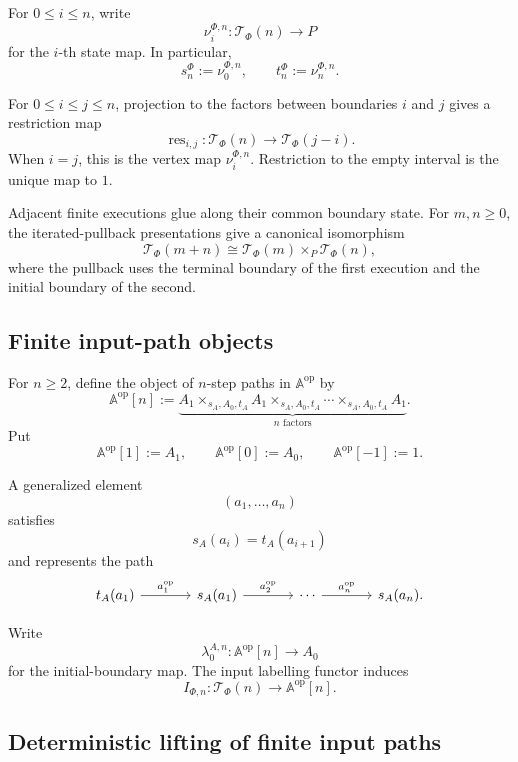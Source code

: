 For \(0\leq i\leq n\), write
\[
    \nu_i^{\Phi,n}:
    \mathscr T_\Phi(n)\to P
\]
for the \(i\)-th state map. In particular,
\[
    s_n^\Phi:=\nu_0^{\Phi,n},
    \qquad
    t_n^\Phi:=\nu_n^{\Phi,n}.
\]

For \(0\leq i\leq j\leq n\), projection to the factors between boundaries
\(i\) and \(j\) gives a restriction map
\[
    \operatorname{res}_{i,j}:
    \mathscr T_\Phi(n)
    \longrightarrow
    \mathscr T_\Phi(j-i).
\]
When \(i=j\), this is the vertex map
\(\nu_i^{\Phi,n}\). Restriction to the empty interval is the unique map to
\(1\).

Adjacent finite executions glue along their common boundary state. For
\(m,n\geq0\), the iterated-pullback presentations give a canonical
isomorphism
\[
    \mathscr T_\Phi(m+n)
    \cong
    \mathscr T_\Phi(m)
    \times_P
    \mathscr T_\Phi(n),
\]
where the pullback uses the terminal boundary of the first execution and the
initial boundary of the second.

\subsection{Finite input-path objects}
\label{subsec:finite-input-path-objects}

For \(n\geq2\), define the object of \(n\)-step paths in
\(\mathbb A^{\mathrm{op}}\) by
\[
    \mathbb A^{\mathrm{op}}[n]
    :=
    \underbrace{
    A_1
    \times_{s_A,A_0,t_A}
    A_1
    \times_{s_A,A_0,t_A}
    \cdots
    \times_{s_A,A_0,t_A}
    A_1
    }_{n\text{ factors}}.
\]
Put
\[
    \mathbb A^{\mathrm{op}}[1]:=A_1,
    \qquad
    \mathbb A^{\mathrm{op}}[0]:=A_0,
    \qquad
    \mathbb A^{\mathrm{op}}[-1]:=1.
\]

A generalized element
\[
    (a_1,\ldots,a_n)
\]
satisfies
\[
    s_A(a_i)=t_A(a_{i+1})
\]
and represents the path
\[
\begin{tikzcd}[column sep=large]
    t_A(a_1)
        \arrow[r, "a_1^{\mathrm{op}}"]
    &
    s_A(a_1)
        \arrow[r, "a_2^{\mathrm{op}}"]
    &
    \cdots
        \arrow[r, "a_n^{\mathrm{op}}"]
    &
    s_A(a_n).
\end{tikzcd}
\]

Write
\[
    \lambda_0^{A,n}:
    \mathbb A^{\mathrm{op}}[n]\to A_0
\]
for the initial-boundary map. The input labelling functor induces
\[
    I_{\Phi,n}:
    \mathscr T_\Phi(n)
    \longrightarrow
    \mathbb A^{\mathrm{op}}[n].
\]

\subsection{Deterministic lifting of finite input paths}
\label{subsec:deterministic-path-lifting}

